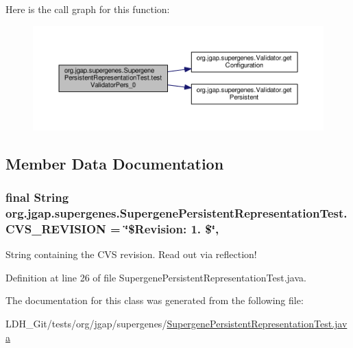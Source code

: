 Here is the call graph for this function\-:
\nopagebreak
\begin{figure}[H]
\begin{center}
\leavevmode
\includegraphics[width=350pt]{classorg_1_1jgap_1_1supergenes_1_1_supergene_persistent_representation_test_a7e1411060cb924b1679a3f8334be9987_cgraph}
\end{center}
\end{figure}




\subsection{Member Data Documentation}
\hypertarget{classorg_1_1jgap_1_1supergenes_1_1_supergene_persistent_representation_test_a689a568da0af2810bb5ce29d3a4dc187}{
\subsubsection[{C\-V\-S\-\_\-\-R\-E\-V\-I\-S\-I\-O\-N}]{\setlength{\rightskip}{0pt plus 5cm}final String org.\-jgap.\-supergenes.\-Supergene\-Persistent\-Representation\-Test.\-C\-V\-S\-\_\-\-R\-E\-V\-I\-S\-I\-O\-N = \char`\"{}\$Revision\-: 1. \$\char`\"{}\hspace{0.3cm}{\ttfamily [static]}, {\ttfamily [private]}}}\label{classorg_1_1jgap_1_1supergenes_1_1_supergene_persistent_representation_test_a689a568da0af2810bb5ce29d3a4dc187}
String containing the C\-V\-S revision. Read out via reflection! 

Definition at line 26 of file Supergene\-Persistent\-Representation\-Test.\-java.



The documentation for this class was generated from the following file\-:\begin{DoxyCompactItemize}
\item 
L\-D\-H\-\_\-\-Git/tests/org/jgap/supergenes/\hyperlink{_supergene_persistent_representation_test_8java}{Supergene\-Persistent\-Representation\-Test.\-java}\end{DoxyCompactItemize}
